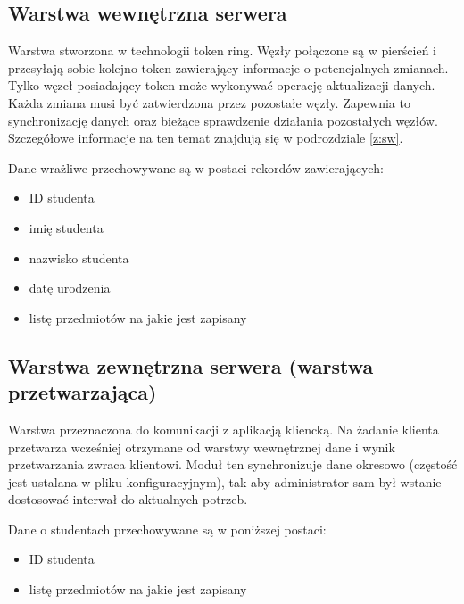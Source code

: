 \subsection*[Warstwa wewnętrzna serwera]{Warstwa wewnętrzna serwera}

\par{Warstwa stworzona w technologii token ring. Węzły połączone są w pierścień i przesyłają sobie kolejno token zawierający informacje o potencjalnych zmianach. Tylko węzeł posiadający token może wykonywać operację aktualizacji danych. Każda zmiana musi być zatwierdzona przez pozostałe węzły. Zapewnia to synchronizację danych oraz bieżące sprawdzenie działania pozostałych węzłów. Szczegółowe informacje na ten temat znajdują się w podrozdziale \ref{z:sw}.}

\par{Dane wrażliwe przechowywane są w postaci rekordów zawierających:}

\begin{itemize}
\item ID studenta
\item imię studenta
\item nazwisko studenta
\item datę urodzenia
\item listę przedmiotów na jakie jest zapisany
\end{itemize}

\par{}

\subsection*[Warstwa zewnętrzna serwera]{Warstwa zewnętrzna serwera (warstwa przetwarzająca)}

\par{Warstwa przeznaczona do komunikacji z aplikacją kliencką. Na żadanie klienta przetwarza wcześniej otrzymane od warstwy wewnętrznej dane i wynik przetwarzania zwraca klientowi. Moduł ten synchronizuje dane okresowo (częstość jest ustalana w pliku konfiguracyjnym), tak aby administrator sam był wstanie dostosować interwał do aktualnych potrzeb. }

\par{Dane o studentach przechowywane są w poniższej postaci:}

\begin{itemize}
\item ID studenta
\item listę przedmiotów na jakie jest zapisany
\end{itemize}

